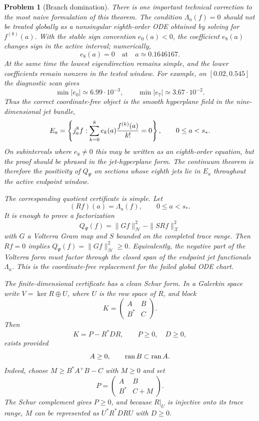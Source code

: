 \documentclass[11pt]{article}
\newtheorem{problem}[theorem]{Problem}
\begin{document}
\begin{problem}[Branch domination]
There is one important technical correction to the most naive formulation of
this theorem.  The condition $\Lambda_a(f)=0$ should not be treated globally as
a nonsingular eighth-order ODE obtained by solving for $f^{(8)}(a)$.  With the
stable sign convention $e_0(a)<0$, the coefficient $e_8(a)$ changes sign in the
active interval; numerically,
\[
  e_8(a)=0\quad\text{at}\quad a\simeq 0.1646167.
\]
At the same time the lowest eigendirection remains simple, and the lower
coefficients remain nonzero in the tested window.  For example, on
$[0.02,0.545]$ the diagnostic scan gives
\[
  \min |e_0|\simeq 6.99\cdot 10^{-3},\qquad
  \min |e_7|\simeq 3.67\cdot 10^{-2}.
\]
Thus the correct coordinate-free object is the smooth hyperplane field in the
nine-dimensional jet bundle,
\[
  E_a=\left\{j_a^8 f:
  \sum_{k=0}^8 e_k(a){f^{(k)}(a)\over k!}=0\right\},
  \qquad 0\le a<s_*.
\]
On subintervals where $e_8\ne0$ this may be written as an eighth-order
equation, but the proof should be phrased in the jet-hyperplane form.  The
continuum theorem is therefore the positivity of $Q_\Psi$ on sections whose
eighth jets lie in $E_a$ throughout the active endpoint window.

The corresponding quotient certificate is simple.  Let
\[
  (Rf)(a)=\Lambda_a(f),\qquad 0\le a<s_*.
\]
It is enough to prove a factorization
\[
  Q_\Psi(f)=\|Gf\|_{\mathcal H}^2-\|SRf\|_{\mathcal X}^2
\]
with $G$ a Volterra Gram map and $S$ bounded on the completed trace range.
Then $Rf=0$ implies $Q_\Psi(f)=\|Gf\|_{\mathcal H}^2\ge0$.  Equivalently, the
negative part of the Volterra form must factor through the closed span of the
endpoint jet functionals $\Lambda_a$.  This is the coordinate-free replacement
for the failed global ODE chart.

The finite-dimensional certificate has a clean Schur form.  In a Galerkin
space write \(V=\ker R\oplus U\), where \(U\) is the row space of \(R\), and
block
\[
  K=\begin{pmatrix} A&B\\ B^*&C\end{pmatrix}.
\]
Then
\[
  K=P-R^*DR,\qquad P\ge0,\quad D\ge0,
\]
exists provided
\[
  A\ge0,\qquad {\rm ran}\,B\subset{\rm ran}\,A.
\]
Indeed, choose \(M\ge B^*A^+B-C\) with \(M\ge0\) and set
\[
  P=\begin{pmatrix} A&B\\ B^*&C+M\end{pmatrix}.
\]
The Schur complement gives \(P\ge0\), and because \(R|_U\) is injective onto
its trace range, \(M\) can be represented as \(U^*R^*DRU\) with \(D\ge0\).


\end{problem}
\end{document}
